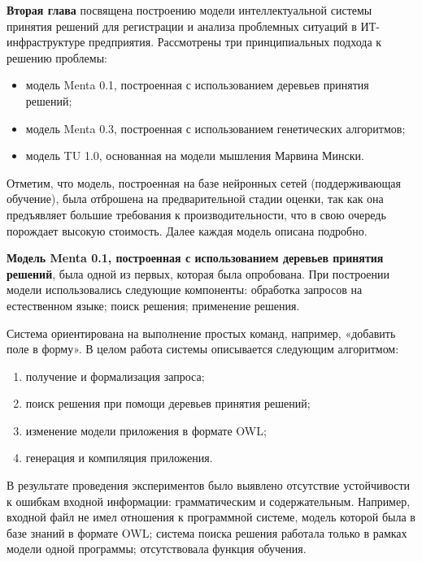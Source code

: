 
\textbf{Вторая глава} посвящена построению модели интеллектуальной системы принятия решений для регистрации и анализа проблемных ситуаций в ИТ-инфраструктуре предприятия. Рассмотрены три принципиальных подхода к решению проблемы:
 \begin{itemize}
	\item модель Menta 0.1, построенная с использованием деревьев принятия решений;
	\item модель Menta 0.3, построенная с использованием генетических алгоритмов;
	\item модель TU 1.0, основанная на модели мышления Марвина Мински.
\end{itemize} \par

Отметим, что модель, построенная на базе нейронных сетей (поддерживающая обучение), была отброшена на предварительной стадии оценки, так как она предъявляет большие требования к производительности, что в свою очередь порождает высокую стоимость. Далее каждая модель описана подробно.

\textbf{Модель Menta 0.1, построенная с использованием деревьев принятия решений}, была одной из первых, которая была опробована. При построении модели использовались следующие компоненты: обработка запросов на естественном языке; поиск решения; применение решения. \par
Система ориентирована на выполнение простых команд, например, «добавить поле в форму». В целом работа системы описывается следующим алгоритмом:
\begin{enumerate}
	\item получение и формализация запроса;
	\item поиск решения при помощи деревьев принятия решений;
	\item изменение модели приложения в формате OWL;
	\item генерация и компиляция приложения.
\end{enumerate} \par
В результате проведения экспериментов было выявлено отсутствие устойчивости к ошибкам входной информации: грамматическим и содержательным. Например, входной файл не имел отношения к программной системе, модель которой была в базе знаний в формате OWL; система поиска решения работала только в рамках модели одной программы;  отсутствовала функция обучения. \par



